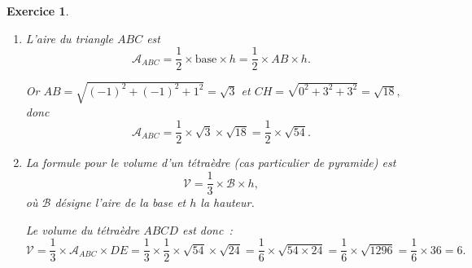 \documentclass[10pt]{article}
\newtheorem{exo}{Exercice}
\begin{document}
\begin{exo}
\begin{enumerate}
\begin{enumerate}
\medskip

Finalement, comme $H$ appartient à $(AB)$ et que $(CH)$ est orthogonale à $(AB),$ $H$ est bien le projeté orthogonal de $C$ sur $(AB).$

\item L'aire du triangle $ABC$ est 
\[\mathcal{A}_{ABC}=\frac{1}{2}\times\text{base}\times h=\frac{1}{2}\times AB\times h.\]

Or $AB=\sqrt{(-1)^2+(-1)^2+1^2}=\sqrt{3}$ et $CH=\sqrt{0^2+3^2+3^2}=\sqrt{18},$ donc
\[\mathcal{A}_{ABC}=\frac{1}{2}\times \sqrt{3}\times \sqrt{18}=\frac{1}{2}\times \sqrt{54}.\]
\item La formule pour le volume d'un tétraèdre (cas particulier de pyramide) est 
\[\mathcal{V}=\frac{1}{3}\times\mathcal{B}\times h,\]
où $\mathcal{B}$ désigne l'aire de la base et $h$ la hauteur.

\medskip
Le volume du tétraèdre $ABCD$ est donc~:
\[\mathcal{V}=\frac{1}{3}\times \mathcal{A}_{ABC}\times DE=\frac{1}{3}\times \frac{1}{2}\times \sqrt{54}\times \sqrt{24}=\frac{1}{6}\times\sqrt{54\times 24}=\frac{1}{6}\times\sqrt{1296}=\frac{1}{6}\times 36=6.\]
\end{enumerate}
\end{enumerate}

\end{exo}
\end{document}
